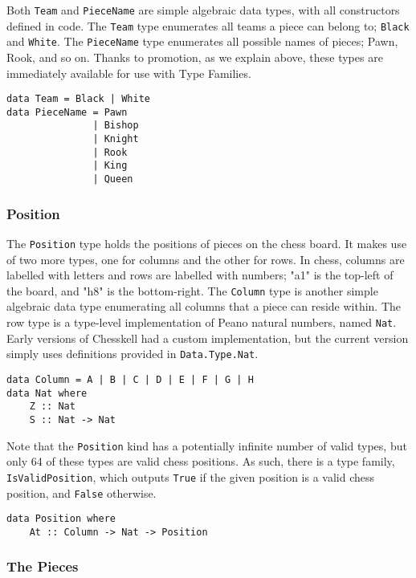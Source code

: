 \documentclass[12pt, a4paper, bibliography=totocnumbered]{scrreprt}
\newcommand{\inline}[1]{\lstinline[basicstyle=\ttfamily\footnotesize]{#1}}
\begin{document}
Both \inline{Team} and \inline{PieceName} are simple algebraic data types, with all constructors defined in code. The \inline{Team} type enumerates all teams a piece can belong to; \inline{Black} and \inline{White}. The \inline{PieceName} type enumerates all possible names of pieces; Pawn, Rook, and so on. Thanks to promotion, as we explain above, these types are immediately available for use with Type Families.

\begin{lstlisting}
data Team = Black | White
data PieceName = Pawn
               | Bishop
               | Knight
               | Rook
               | King
               | Queen
\end{lstlisting}

\subsubsection{Position}

The \inline{Position} type holds the positions of pieces on the chess board. It makes use of two more types, one for columns and the other for rows. In chess, columns are labelled with letters and rows are labelled with numbers; "a1" is the top-left of the board, and "h8" is the bottom-right. The \inline{Column} type is another simple algebraic data type enumerating all columns that a piece can reside within. The row type is a type-level implementation of Peano natural numbers, named \inline{Nat}. Early versions of Chesskell had a custom implementation, but the current version simply uses definitions provided in \inline{Data.Type.Nat}.

\begin{lstlisting}
data Column = A | B | C | D | E | F | G | H
data Nat where
    Z :: Nat
    S :: Nat -> Nat
\end{lstlisting}

Note that the \inline{Position} kind has a potentially infinite number of valid types, but only 64 of these types are valid chess positions. As such, there is a type family, \inline{IsValidPosition}, which outputs \inline{True} if the given position is a valid chess position, and \inline{False} otherwise.

\begin{lstlisting}
data Position where
    At :: Column -> Nat -> Position
\end{lstlisting}

\subsubsection{The Pieces}
\end{document}
